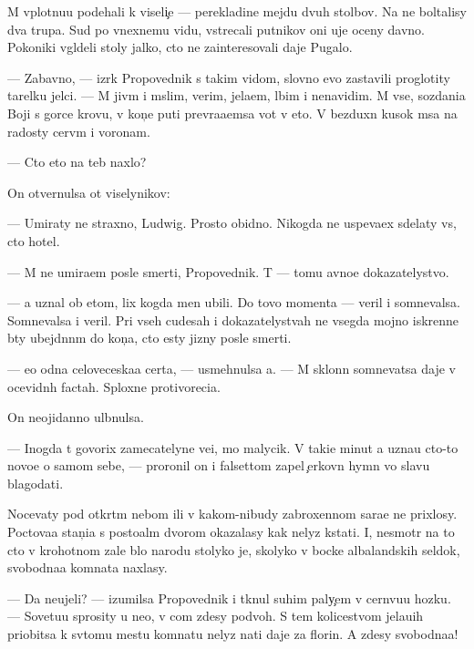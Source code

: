 \documentclass[10pt]{book}
\begin{document}
M{\yi} vplotnu{\y}u pod{\y}ehali k viseli{\c}e — perekladine mejdu dvuh stolbov. Na ne{\y} boltalisy dva trupa. Sud{\ia} po vnexnemu vidu, vstrecali putnikov oni uje oceny davno. Poko{\y}niki v{\yi}gl{\ia}deli stoly jalko, cto ne zainteresovali daje Pugalo.

— Zabavno, — izr{\e}k Propovednik s takim vidom, slovno {\y}evo zastavili proglotity tarelku jelci. — M{\yi} jiv{\e}m i m{\yi}slim, verim, jela{\y}em, l{\io}bim i nenavidim. M{\yi} vse, sozdani{\y}a Boj{\yf}i s gor{\ia}ce{\y} krov{\y}u, v kon{\c}e puti prevra{\x}a{\y}emsa vot v eto. V bezduxn{\yi}{\y} kusok m{\ia}sa na radosty cerv{\ia}m i voronam.

— Cto eto na teb{\ia} naxlo?

On otvernulsa ot viselynikov:

— Umiraty ne straxno, Ludwig. Prosto obidno. Nikogda ne uspeva{\y}ex sdelaty vs{\e}, cto hotel.

— M{\yi} ne umira{\y}em posle smerti, Propovednik. T{\yi} — tomu {\y}avno{\y}e dokazatelystvo.

— {\Y}a uznal ob etom, lix kogda men{\ia} ubili. Do tovo momenta — veril i somnevalsa. Somnevalsa i veril. Pri vseh cudesah i dokazatelystvah ne vsegda mojno iskrenne b{\yi}ty ubejd{\e}nn{\yi}m do kon{\c}a, cto {\y}esty jizny posle smerti.

— {\Y}e{\x}o odna celoveceska{\y}a certa, — usmehnulsa {\y}a. — M{\yi} sklonn{\yi} somnevatsa daje v ocevidn{\yi}h factah. Sploxn{\yi}{\y}e protivoreci{\y}a.

On neojidanno ul{\yi}bnulsa.

— Inogda t{\yi} govorix zamecatelyn{\yi}{\y}e ve{\x}i, mo{\y} malycik. V taki{\y}e minut{\yi} {\y}a uzna{\y}u cto-to novo{\y}e o samom sebe, — proronil on i falsettom zapel {\c}erkovn{\yi}{\y} hymn vo slavu blagodati.



Nocevaty pod otkr{\yi}t{\yi}m nebom ili v kakom-nibudy zabroxennom sara{\y}e ne prixlosy. Poctova{\y}a stan{\c}i{\y}a s posto{\y}al{\yi}m dvorom okazalasy kak nelyz{\ia} kstati. I, nesmotr{\ia} na to cto v krohotnom zale b{\yi}lo narodu stolyko je, skolyko v bocke albalandskih sel{\e}dok, svobodna{\y}a komnata naxlasy.

— Da neujeli? — izumilsa Propovednik i tknul suhim paly{\c}em v cern{\ia}vu{\y}u hoz{\ia}{\y}ku. — Sovetu{\y}u sprosity u ne{\y}o, v com zdesy podvoh. S tem kolicestvom jela{\y}u{\x}ih priob{\x}itsa k sv{\ia}tomu mestu komnatu nelyz{\ia} na{\y}ti daje za florin. A zdesy svobodna{\y}a!
\end{document}
